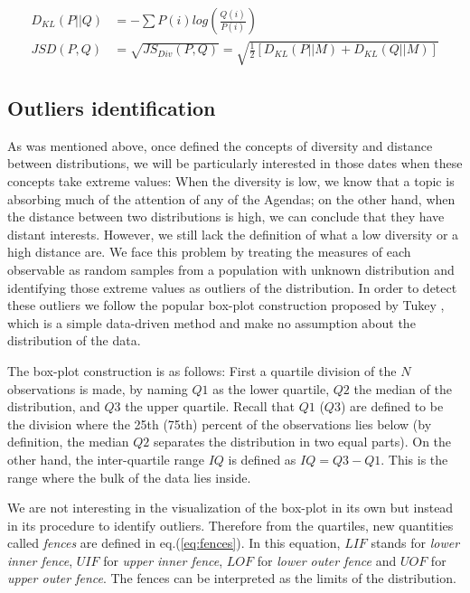 \documentclass{bmcart}
\begin{document}
\begin{eqnarray}\label{eq:jensen_shannon_distance}
D_{KL}(P||Q) &= -\sum{P(i) log(\frac{Q(i)}{P(i)})} \nonumber \\
JSD(P,Q) &= \sqrt{JS_{Div}(P,Q)} = \sqrt{\frac{1}{2}[D_{KL}(P||M) + D_{KL}(Q||M)] } 
\end{eqnarray}

\subsection*{Outliers identification}

\par As was mentioned above, once defined the concepts of diversity and distance between distributions, we will be particularly interested in those dates when these concepts take extreme values: When the diversity is low, we know that a topic is absorbing much of the attention of any of the Agendas; on the other hand, when the distance between two distributions is high, we can conclude that they have distant interests.
However, we still lack the definition of what a low diversity or a high distance are. 
We face this problem by treating the measures of each observable as random samples from a population with unknown distribution and identifying those extreme values as outliers of the distribution. 
In order to detect these outliers we follow the popular box-plot construction proposed by Tukey \cite{tukey1977exploratory}, which is a simple data-driven method and make no assumption about the distribution of the data.
\par The box-plot construction is as follows: First a quartile division of the $N$ observations is made, by naming $Q1$ as the lower quartile, $Q2$ the median of the distribution, and $Q3$ the upper quartile. Recall that $Q1$ ($Q3$) are defined to be the division where the 25th (75th) percent of the observations lies below (by definition, the median $Q2$ separates the distribution in two equal parts). On the other hand, the inter-quartile range $IQ$ is defined as $IQ = Q3 - Q1$. This is the range where the bulk of the data lies inside.
\par We are not interesting in the visualization of the box-plot in its own but instead in its procedure to identify outliers. Therefore from the quartiles, new quantities called \emph{fences} are defined in eq.(\ref{eq:fences}). In this equation, $LIF$ stands for \emph{lower inner fence}, $UIF$ for \emph{upper inner fence}, $LOF$ for \emph{lower outer fence} and $UOF$ for \emph{upper outer fence}. The fences can be interpreted as the limits of the distribution.
\end{document}
